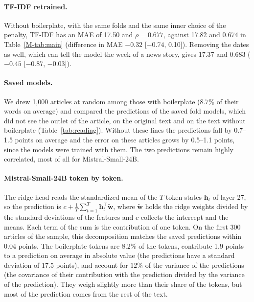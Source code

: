 \documentclass[11pt,a4paper]{article}
\begin{document}
\paragraph{TF-IDF retrained.} Without boilerplate, with the same folds and the same inner choice of the penalty, TF-IDF
has an MAE of 17.50 and $\rho = 0.677$, against 17.82 and 0.674 in Table~\ref{M-tab:main} (difference in MAE $-0.32$
[$-0.74$, 0.10]). Removing the dates as well, which can tell the model the week of a news story, gives 17.37 and 0.683
($-0.45$ [$-0.87$, $-0.03$]).

\paragraph{Saved models.} We drew 1,000 articles at random among those with boilerplate (8.7\% of their words on
average) and compared the predictions of the saved fold models, which did not see the outlet of the article, on the
original text and on the text without boilerplate (Table~\ref{tab:reading}). Without these lines the predictions fall
by 0.7--1.5 points on average and the error on these articles grows by 0.5--1.1 points, since the models were trained
with them. The two predictions remain highly correlated, most of all for Mistral-Small-24B.

\paragraph{Mistral-Small-24B token by token.} The ridge head reads the standardized mean of the $T$ token states
$\mathbf{h}_t$ of layer 27, so the prediction is $c + \frac{1}{T}\sum_{t=1}^{T}\mathbf{h}_t^\top\tilde{\mathbf{w}}$,
where $\tilde{\mathbf{w}}$ holds the ridge weights divided by the standard deviations of the features and $c$ collects
the intercept and the means. Each term of the sum is the contribution of one token. On the first 300 articles of the
sample, this decomposition matches the saved predictions within 0.04 points. The boilerplate tokens are 8.2\% of the
tokens, contribute 1.9 points to a prediction on average in absolute value (the predictions have a standard deviation of
17.5 points), and account for 12\% of the variance of the predictions (the covariance of their contribution with the
prediction divided by the variance of the prediction). They weigh slightly more than their share of the tokens, but most
of the prediction comes from the rest of the text.
\end{document}
